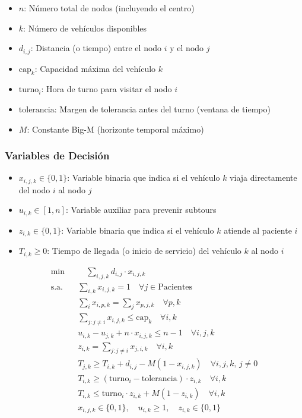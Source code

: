\documentclass[12pt]{article}
\begin{document}
\begin{itemize}
    \item $n$: Número total de nodos (incluyendo el centro)
    \item $k$: Número de vehículos disponibles
    \item $d_{i,j}$: Distancia (o tiempo) entre el nodo $i$ y el nodo $j$
    \item $\text{cap}_k$: Capacidad máxima del vehículo $k$
    \item $\text{turno}_i$: Hora de turno para visitar el nodo $i$
    \item $\text{tolerancia}$: Margen de tolerancia antes del turno (ventana de tiempo)
    \item $M$: Constante Big-M (horizonte temporal máximo)
\end{itemize}

\subsubsection*{Variables de Decisión}

\begin{itemize}
    \item $x_{i,j,k} \in \{0,1\}$: Variable binaria que indica si el vehículo $k$ viaja directamente del nodo $i$ al nodo $j$
    \item $u_{i,k} \in [1,n]$: Variable auxiliar para prevenir subtours
    \item $z_{i,k} \in \{0,1\}$: Variable binaria que indica si el vehículo $k$ atiende al paciente $i$
    \item $T_{i,k} \geq 0$: Tiempo de llegada (o inicio de servicio) del vehículo $k$ al nodo $i$
\end{itemize}

\begin{align*}
  \min & \quad \sum_{i,j,k} d_{i,j} \cdot x_{i,j,k} \\
  \text{s.a.} \quad
    & \sum_{i,k} x_{i,j,k} = 1 \quad \forall j \in \text{Pacientes} \\
    & \sum_{i} x_{i,p,k} = \sum_{j} x_{p,j,k} \quad \forall p, k \\
    & \sum_{j: j \ne i} x_{i,j,k} \leq \text{cap}_k \quad \forall i,k \\
    & u_{i,k} - u_{j,k} + n \cdot x_{i,j,k} \leq n - 1 \quad \forall i,j,k \\
    & z_{i,k} = \sum_{j: j \ne i} x_{j,i,k} \quad \forall i,k \\
    & T_{j,k} \geq T_{i,k} + d_{i,j} - M(1 - x_{i,j,k}) \quad \forall i,j,k, \, j \ne 0 \\
    & T_{i,k} \geq (\text{turno}_i - \text{tolerancia}) \cdot z_{i,k} \quad \forall i,k \\
    & T_{i,k} \leq \text{turno}_i \cdot z_{i,k} + M(1 - z_{i,k}) \quad \forall i,k \\
    & x_{i,j,k} \in \{0,1\}, \quad u_{i,k} \geq 1, \quad z_{i,k} \in \{0,1\}
\end{align*}
\end{document}
